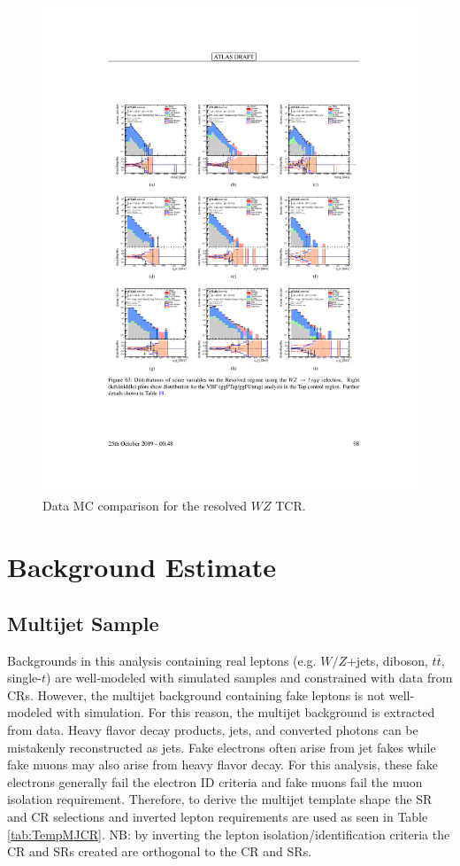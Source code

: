 \begin{figure}[h!]
  \centering
  \includegraphics[width=\hsize]{figures/Analysis/datamc/resolved_wz_tcr.pdf}
      \caption{Data MC comparison for the resolved $WZ$ TCR.} 
  \label{fig:resolved_wz_TCR_datamc}
\end{figure} 
\FloatBarrier


\section{Background Estimate}
\subsection{Multijet Sample}
Backgrounds in this analysis containing real leptons (e.g. $W/Z$+jets, diboson, $t\bar{t}$, single-$t$) are well-modeled with simulated samples and constrained with data from CRs. However, the multijet background containing fake leptons is not well-modeled with simulation. For this reason, the multijet background is extracted from data. Heavy flavor decay products, jets, and converted photons can be mistakenly reconstructed as jets. Fake electrons often arise from jet fakes while fake muons may also arise from heavy flavor decay.  For this analysis, these fake electrons generally fail the electron ID criteria and fake muons fail the muon isolation requirement. Therefore, to derive the multijet template shape the SR and CR selections and inverted lepton requirements are used as seen in Table \ref{tab:TempMJCR}. NB: by inverting the lepton isolation/identification criteria the CR and SRs created are orthogonal to the CR and SRs. 

